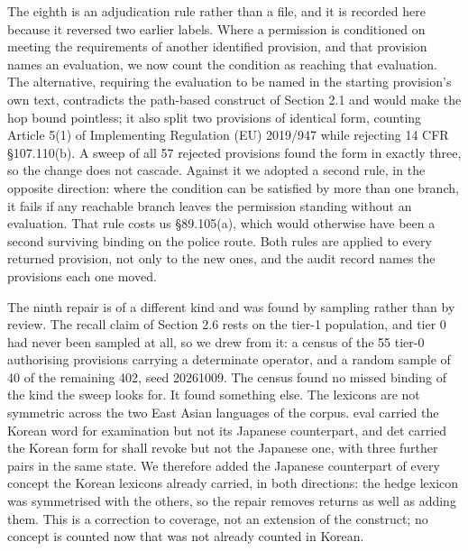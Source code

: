 The eighth is an adjudication rule rather than a file, and it is recorded here because it reversed two earlier labels. Where a permission is conditioned on meeting the requirements of another identified provision, and that provision names an evaluation, we now count the condition as reaching that evaluation. The alternative, requiring the evaluation to be named in the starting provision's own text, contradicts the path-based construct of Section 2.1 and would make the hop bound pointless; it also split two provisions of identical form, counting Article 5(1) of Implementing Regulation (EU) 2019/947 while rejecting 14 CFR \S{}107.110(b). A sweep of all 57 rejected provisions found the form in exactly three, so the change does not cascade. Against it we adopted a second rule, in the opposite direction: where the condition can be satisfied by more than one branch, it fails if any reachable branch leaves the permission standing without an evaluation. That rule costs us \S{}89.105(a), which would otherwise have been a second surviving binding on the police route. Both rules are applied to every returned provision, not only to the new ones, and the audit record names the provisions each one moved.

The ninth repair is of a different kind and was found by sampling rather than by review. The recall claim of Section 2.6 rests on the tier-1 population, and tier 0 had never been sampled at all, so we drew from it: a census of the 55 tier-0 authorising provisions carrying a determinate operator, and a random sample of 40 of the remaining 402, seed 20261009. The census found no missed binding of the kind the sweep looks for. It found something else. The lexicons are not symmetric across the two East Asian languages of the corpus. eval carried the Korean word for examination but not its Japanese counterpart, and det carried the Korean form for shall revoke but not the Japanese one, with three further pairs in the same state. We therefore added the Japanese counterpart of every concept the Korean lexicons already carried, in both directions: the hedge lexicon was symmetrised with the others, so the repair removes returns as well as adding them. This is a correction to coverage, not an extension of the construct; no concept is counted now that was not already counted in Korean.

